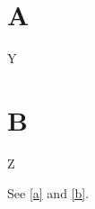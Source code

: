 \documentclass{article}
\begin{document}
\section{A}
\begin{listing}[h]
Y\caption{One.}\label{a}
\end{listing}
\section{B}
\begin{listing}[h]
Z\caption{Two.}\label{b}
\end{listing}
See \ref{a} and \ref{b}.
\end{document}
